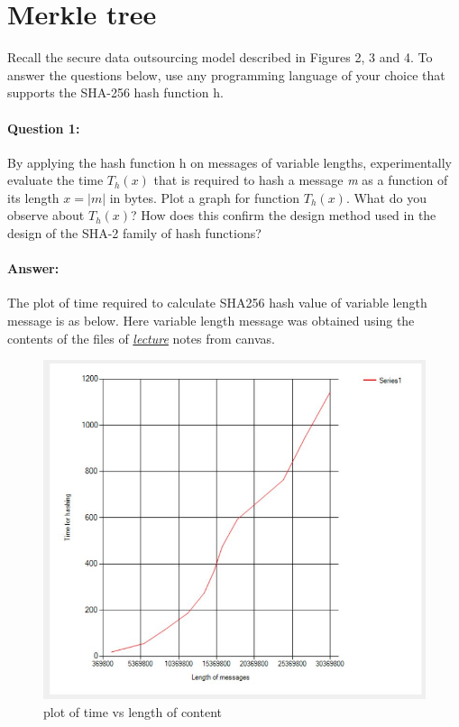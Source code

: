 \documentclass{article}
\begin{document}
        

\section{Merkle tree}
    Recall the secure data outsourcing model described in Figures 2, 3 and 4. To answer the questions below, use any programming language of your choice that supports the SHA-256 hash function h.
    
    \paragraph{Question 1:} By applying the hash function h on messages of variable lengths, experimentally evaluate the time $T_h(x)$ that is required to hash a message \emph{m} as a function of its length $x = |m|$ in bytes. Plot a graph for function $T_h(x)$. What do you observe about $T_h(x)$? How does this confirm the design method used in the design of the SHA-2 family of hash functions?
    \paragraph{Answer:\newline}
        The plot of time required to calculate SHA256 hash value of variable length message is as below. Here variable length message was obtained using the contents of the files of \underline{\emph{lecture}} notes from canvas.
        
        \begin{figure}[H]
            \centering
            \includegraphics[scale=0.4]{S4Q1}
            \caption{plot of time vs length of content}
            \label{fig:SHA256 timing vs content length}
        \end{figure}
        
\end{document}

